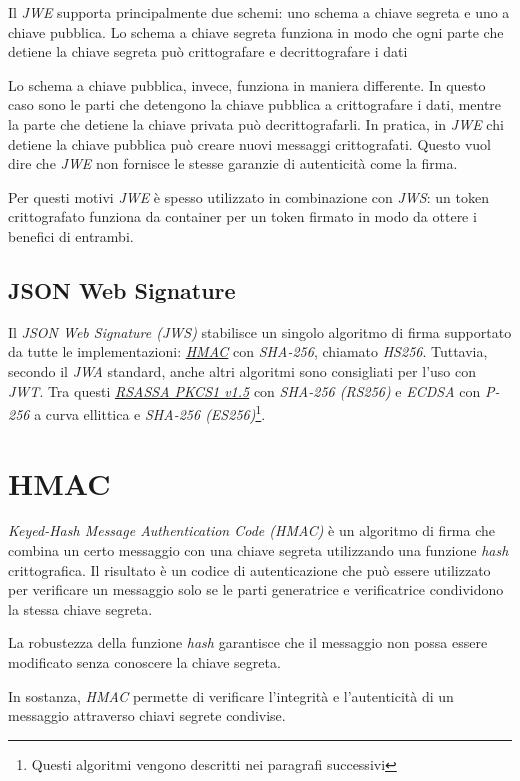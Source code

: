 Il \emph{JWE} supporta principalmente due schemi: uno schema a chiave segreta e uno a chiave pubblica.
Lo schema a chiave segreta funziona in modo che ogni parte che detiene la chiave segreta può crittografare e decrittografare i dati

Lo schema a chiave pubblica, invece, funziona in maniera differente.
In questo caso sono le parti che detengono la chiave pubblica a crittografare i dati, mentre la parte che detiene la chiave privata può decrittografarli.
In pratica, in \emph{JWE} chi detiene la chiave pubblica può creare nuovi messaggi crittografati.
Questo vuol dire che \emph{JWE} non fornisce le stesse garanzie di autenticità come la firma.

Per questi motivi \emph{JWE} è spesso utilizzato in combinazione con \emph{\gls{JWS}}: un token crittografato funziona da container per un token firmato in modo da ottere i benefici di entrambi.

\subsection{JSON Web Signature}
Il \emph{JSON Web Signature (JWS)} stabilisce un singolo algoritmo di firma supportato da tutte le implementazioni: \emph{\hyperref[cap:hmac]{HMAC}} con \emph{SHA-256}, chiamato \emph{HS256}.
Tuttavia, secondo il \emph{\gls{JWA}} standard, anche altri algoritmi sono consigliati per l'uso con \emph{JWT}.
Tra questi \emph{\hyperref[cap:rsassa]{RSASSA PKCS1 v1.5}} con \emph{SHA-256 (RS256)} e \emph{ECDSA} con \emph{P-256} a curva ellittica e \emph{SHA-256 (ES256)}\footnote{Questi algoritmi vengono descritti nei paragrafi successivi}.


\section{HMAC}
\label{cap:hmac}

\emph{Keyed-Hash Message Authentication Code (HMAC)} è un algoritmo di firma che combina un certo messaggio con una chiave segreta utilizzando una funzione \emph{hash} crittografica.
Il risultato è un codice di autenticazione che può essere utilizzato per verificare un messaggio solo se le parti generatrice e verificatrice condividono la stessa chiave segreta.

La robustezza della funzione \emph{hash} garantisce che il messaggio non possa essere modificato senza conoscere la chiave segreta.

In sostanza, \emph{HMAC} permette di verificare l'integrità e l'autenticità di un messaggio attraverso chiavi segrete condivise.

